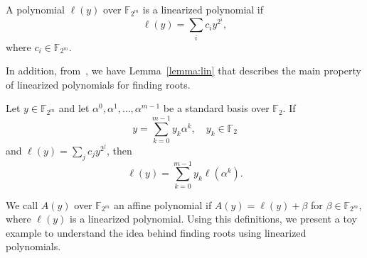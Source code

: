 \begin{definition}
A polynomial $\ell(y)$ over $\mathbb{F}_{2^m}$ is a linearized polynomial if
\begin{equation}
    \ell(y) = \sum_i c_iy^{2^i},
\end{equation}
where $c_i \in \mathbb{F}_{2^m}$.
\end{definition}
In addition, from~\cite{truong2001fast}, we have Lemma~\ref{lemma:lin} that describes the main property of linearized polynomials for finding roots.
\begin{lemma}
\label{lemma:lin}
    Let $y \in \mathbb{F}_{2^m}$ and let $\alpha^0, \alpha^1, \ldots, \alpha^{m-1}$ be a standard basis over $\mathbb{F}_2$. If
    \begin{equation}
        y = \sum_{k=0}^{m-1} y_k\alpha^k,\quad y_k \in \mathbb{F}_2
    \end{equation}
    and $\ell(y) =\sum_j c_jy^{2^j}$, then
      \begin{equation}
        \ell(y) = \sum_{k=0}^{m-1} y_k\ell(\alpha^k).
    \end{equation}
\end{lemma}

We call $A(y)$ over $\mathbb{F}_{2^m}$ an affine polynomial if $A(y) = \ell(y) + \beta$ for $\beta \in \mathbb{F}_{2^m}$, where $\ell(y)$ is a linearized polynomial. Using this definitions, we present a toy example to understand the idea behind finding roots using linearized polynomials.

